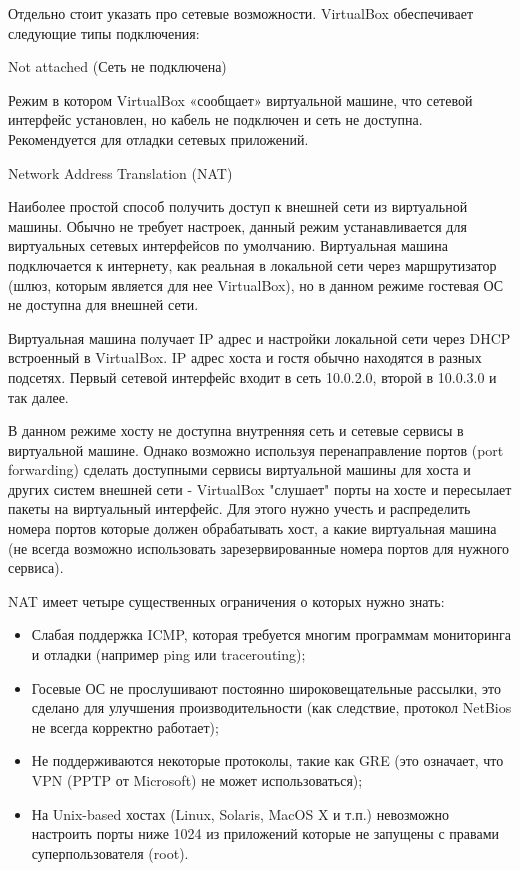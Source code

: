 Отдельно стоит указать про сетевые возможности. VirtualBox обеспечивает следующие типы подключения:
\begin{itemize}
{\item Not attached (Сеть не подключена)

Режим в котором VirtualBox «сообщает» виртуальной машине, что сетевой интерфейс установлен, но кабель не подключен и сеть не доступна. Рекомендуется для отладки сетевых приложений.}

{\item Network Address Translation (NAT)

Наиболее простой способ получить доступ к внешней сети из виртуальной машины. Обычно не требует настроек, данный режим устанавливается для виртуальных сетевых интерфейсов по умолчанию. Виртуальная машина подключается к интернету, как реальная в локальной сети через маршрутизатор (шлюз, которым является для нее VirtualBox), но в данном режиме гостевая ОС не доступна для внешней сети.

Виртуальная машина получает IP адрес и настройки локальной сети через DHCP встроенный в VirtualBox. IP адрес хоста и гостя обычно находятся в разных подсетях. Первый сетевой интерфейс входит в сеть 10.0.2.0, второй в 10.0.3.0 и так далее. 

В данном режиме хосту не доступна внутренняя сеть и сетевые сервисы в виртуальной машине. Однако возможно используя перенаправление портов (port forwarding) сделать доступными сервисы виртуальной машины для хоста и других систем внешней сети - VirtualBox "слушает" порты на хосте и пересылает пакеты на виртуальный интерфейс. Для этого нужно учесть и распределить номера портов которые должен обрабатывать хост, а какие виртуальная машина (не всегда возможно использовать зарезервированные номера портов для нужного сервиса).


NAT имеет четыре существенных ограничения о которых нужно знать:
	\begin{itemize}
	\item Слабая поддержка ICMP, которая требуется многим программам мониторинга и отладки (например ping 	или tracerouting);
	\item Госевые ОС не прослушивают постоянно широковещательные рассылки, это сделано для улучшения производительности (как следствие, протокол NetBios не всегда корректно работает);
	\item Не поддерживаются некоторые протоколы, такие как GRE (это означает, что VPN (PPTP от Microsoft) не может использоваться);
	\item На Unix-based хостах (Linux, Solaris, MacOS X и т.п.) невозможно настроить порты ниже 1024 из приложений которые не запущены с правами суперпользователя (root). 
	\end{itemize}
}


\end{itemize}
